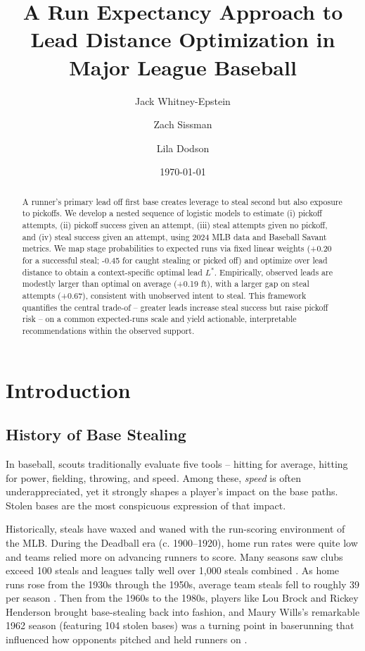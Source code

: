 \documentclass[12pt,letterpaper]{article}
\title{A Run Expectancy Approach to Lead Distance Optimization in Major League Baseball}
\author[1]{Jack Whitney-Epstein}
\author[2]{Zach Sissman}
\author[3]{Lila Dodson}
\affil[1]{\small The Brunswick School, Greenwich, CT}
\affil[2]{\small Community School of Naples, Naples, FL}
\affil[3]{\small San Francisco University High School, San Francisco, CA}
\date{\today}
\begin{document}
\maketitle

\begin{abstract}
    A runner's primary lead off first base creates leverage to steal second but also exposure to pickoffs. We develop a nested sequence of logistic models to estimate (i) pickoff attempts, (ii) pickoff success given an attempt, (iii) steal attempts given no pickoff, and (iv) steal success given an attempt, using 2024 MLB data and Baseball Savant metrics. We map stage probabilities to expected runs via fixed linear weights (+0.20 for a successful steal; -0.45 for caught stealing or picked off) and optimize over lead distance to obtain a context-specific optimal lead $L^*$. Empirically, observed leads are modestly larger than optimal on average (+0.19 ft), with a larger gap on steal attempts (+0.67), consistent with unobserved intent to steal. This framework quantifies the central trade-of -- greater leads increase steal success but raise pickoff risk -- on a common expected-runs scale and yield actionable, interpretable recommendations within the observed support.
\end{abstract}

\section{Introduction}

\subsection{History of Base Stealing}

In baseball, scouts traditionally evaluate five tools -- hitting for average, hitting for power, fielding, throwing, and speed. Among these, \emph{speed} is often underappreciated, yet it strongly shapes a player's impact on the base paths. Stolen bases are the most conspicuous expression of that impact.

Historically, steals have waxed and waned with the run-scoring environment of the MLB. During the Deadball era (c. 1900--1920), home run rates were quite low and teams relied more on advancing runners to score. Many seasons saw clubs exceed 100 steals and leagues tally well over 1,000 steals combined \citep{McMurray2015Deadball}. As home runs rose from the 1930s through the 1950s, average team steals fell to roughly 39 per season \citep{BaseballReference1950}. Then from the 1960s to the 1980s, players like Lou Brock and Rickey Henderson brought base-stealing back into fashion, and Maury Wills's remarkable 1962 season (featuring 104 stolen bases) was a turning point in baserunning that influenced how opponents pitched and held runners on \citep{Vazzana2016MauryWills}.
\end{document}
